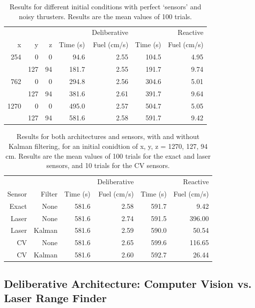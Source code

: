 \documentclass[journal, 10pt]{IEEEtran}
\begin{document}
\begin{table}
\centering
\normalsize
\caption{\label{mean}Results for different initial conditions with perfect `sensors' and noisy thrusters. Results are the mean values of 100 trials.}
\begin{tabular}{r r r | r r | r r}
\toprule
     &     &    &          & Deliberative &           & Reactive \\
   x &   y & z  & Time (s) & Fuel (cm/s) &  Time (s) & Fuel (cm/s) \\
\midrule
254  & 0   & 0  &  94.6 & 2.55 & 104.5 & 4.95 \\
     & 127 & 94 & 181.7 & 2.55 & 191.7 & 9.74 \\
762  & 0   & 0  & 294.8 & 2.56 & 304.6 & 5.01 \\
     & 127 & 94 & 381.6 & 2.61 & 391.7 & 9.64 \\
1270 & 0   & 0  & 495.0 & 2.57 & 504.7 & 5.05 \\
     & 127 & 94 & 581.6 & 2.58 & 591.7 & 9.42 \\
\bottomrule
\end{tabular}
\end{table}

\begin{table}
\centering
\normalsize
\caption{\label{res_comparisons}Results for both architectures and sensors, with and without Kalman filtering, for an initial conidtion of x, y, z = 1270, 127, 94 cm. Results are the mean values of 100 trials for the exact and laser sensors, and 10 trials for the CV sensors.}
\begin{tabular}{r r | r r | r r}
\toprule
       &          &          & Deliberative &           & Reactive \\
Sensor & Filter &  Time (s) & Fuel (cm/s) &  Time (s) &   Fuel (cm/s) \\
\midrule
Exact &   None & 581.6 & 2.58 & 591.7 &   9.42 \\
Laser &   None & 581.6 & 2.74 & 591.5 & 396.00 \\
Laser & Kalman & 581.6 & 2.59 & 590.0 &  50.54 \\
   CV &   None & 581.6 & 2.65 & 599.6 & 116.65 \\
   CV & Kalman & 581.6 & 2.60 & 592.7 &  26.44 \\
\bottomrule
\end{tabular}
\end{table}

\subsection{Deliberative Architecture: Computer Vision vs. Laser Range Finder}
\end{document}

